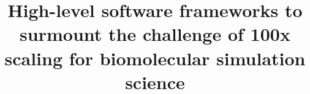 \documentclass[10pt,letterpaper,draft]{article}
\date{}
\begin{document}
\title{\bf High-level software frameworks to surmount the challenge of 100x
  scaling for biomolecular simulation science}

\maketitle

\vspace{-0.9in}





\renewcommand{\thepage}{\arabic{page}}

\end{document}
